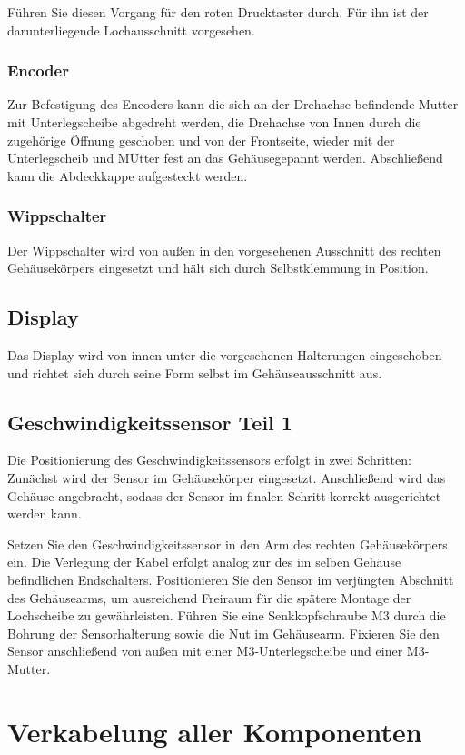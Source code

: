 Führen Sie diesen Vorgang für den roten Drucktaster durch. Für ihn ist der darunterliegende Lochausschnitt vorgesehen.

\subsection{Encoder}
Zur Befestigung des Encoders kann die sich an der Drehachse befindende Mutter mit Unterlegscheibe abgedreht werden, die Drehachse von Innen durch die zugehörige Öffnung geschoben und von der Frontseite, wieder mit der Unterlegscheib und MUtter fest an das Gehäusegepannt werden. Abschließend kann die Abdeckkappe aufgesteckt werden. 

\subsection{Wippschalter}
Der Wippschalter wird von außen in den vorgesehenen Ausschnitt des rechten Gehäusekörpers eingesetzt und hält sich durch Selbstklemmung in Position. 

\section{Display}
Das Display wird von innen unter die vorgesehenen Halterungen eingeschoben und richtet sich durch seine Form selbst im Gehäuseausschnitt aus.

\section{Geschwindigkeitssensor Teil 1}
Die Positionierung des Geschwindigkeitssensors erfolgt in zwei Schritten: Zunächst wird der Sensor im Gehäusekörper eingesetzt. Anschließend wird das Gehäuse angebracht, sodass der Sensor im finalen Schritt korrekt ausgerichtet werden kann.

Setzen Sie den Geschwindigkeitssensor in den Arm des rechten Gehäusekörpers ein. Die Verlegung der Kabel erfolgt analog zur des im selben Gehäuse befindlichen Endschalters.
Positionieren Sie den Sensor im verjüngten Abschnitt des Gehäusearms, um ausreichend Freiraum für die spätere Montage der Lochscheibe zu gewährleisten. Führen Sie eine Senkkopfschraube M3 durch die Bohrung der Sensorhalterung sowie die Nut im Gehäusearm. Fixieren Sie den Sensor anschließend von außen mit einer M3-Unterlegscheibe und einer M3-Mutter.

\chapter{Verkabelung aller Komponenten}

